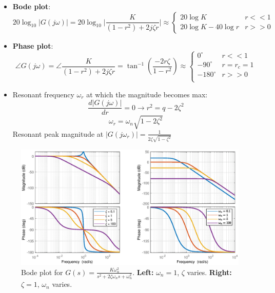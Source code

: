 \begin{itemize}
    \item \textbf{Bode plot}:
    \[
        20\log_{10}\lvert G(j\omega) \rvert  =  20\log_{10} \bigg\lvert \frac{K}{(1-r^{2})+2j\zeta r} \bigg\rvert \approx 
        \begin{cases}
            20\log K            & r<<1 \\
            20\log K - 40\log r & r>>0
        \end{cases}
    \]

    \item \textbf{Phase plot}:
    \[
        \angle G(j\omega) = \angle \frac{K}{(1-r^{2})+2j\zeta r} =  \tan^{-1}(\frac{-2r\zeta}{1-r^{2}}) \approx 
        \begin{cases}
            0^{\circ}       & r<<1\\
            -90^{\circ}     & r = r_{c} = 1\\
            -180^{\circ}    & r>>0\\
        \end{cases}
    \]
    
    \item Resonant frequency $\omega_{r}$ at which the magnitude becomes max:
    \[
        \frac{d\lvert G(j\omega) \rvert}{dr}=0 \to r^{2} = q-2\zeta^{2}
    \]
    \[
        \omega_{r} = \omega_{n}\sqrt{1-2\zeta^{2}}
    \]
    Resonant peak magnitude at $\lvert G(j\omega_{r}) \rvert =\frac{1}{2\zeta\sqrt{1-\zeta^{2}}} $
\end{itemize}
\vspace{-.6cm}
\begin{figure}[H]
    \centering
    \includegraphics[width=\textwidth]{images/bode1.eps}
    \caption{Bode plot for $G(s) = \frac{K\omega_{n}^{2}}{s^{2}+2\zeta\omega_{n}s+\omega_{n}^{2}}$. \textbf{Left:} $\omega_{n}=1$, $\zeta$ varies. \textbf{Right:} $\zeta=1$, $\omega_{n}$ varies.}
\end{figure}

